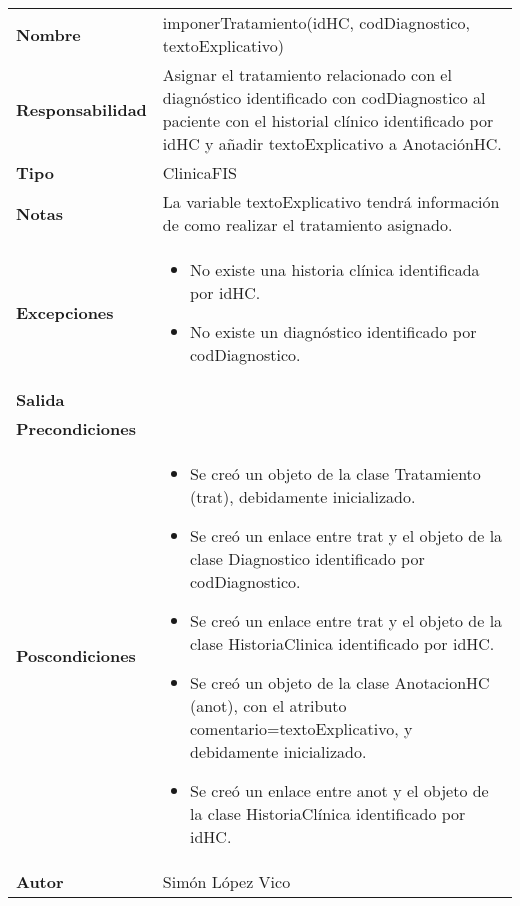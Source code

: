 \documentclass[11pt,a4paper]{article}
\newenvironment{itemizenomargins}
    {\begin{minipage}[t]{1\linewidth}\begin{itemize}}
    {\end{itemize}\end{minipage}}
\begin{document}
\begin{table}[H]
	\centering
	\label{my-label}
	\begin{tabularx}{\textwidth}{l|X}
		\textbf{Nombre}          & imponerTratamiento(idHC, codDiagnostico, textoExplicativo)\\
		\textbf{Responsabilidad} & Asignar el tratamiento relacionado con el diagnóstico identificado con codDiagnostico al paciente con el historial clínico identificado por idHC y añadir textoExplicativo a AnotaciónHC.  \\
		\textbf{Tipo}            & ClinicaFIS \\
		\textbf{Notas}           & La variable textoExplicativo tendrá información de como realizar el tratamiento asignado. \\
		\textbf{Excepciones}     & 
		\begin{itemizenomargins}
			\item No existe una historia clínica identificada por idHC.
			\item No existe un diagnóstico identificado por codDiagnostico.
		\end{itemizenomargins} \\
		\textbf{Salida}          &  \\
		\textbf{Precondiciones}  &  \\
		\textbf{Poscondiciones}  &
		\begin{itemizenomargins}
			\item Se creó un objeto de la clase Tratamiento (trat), debidamente inicializado.
			\item Se creó un enlace entre trat y el objeto de la clase Diagnostico identificado por codDiagnostico. 
			\item Se creó un enlace entre trat y el objeto de la clase HistoriaClinica identificado por idHC.
			\item Se creó un objeto de la clase AnotacionHC (anot), con el atributo comentario=textoExplicativo, y debidamente inicializado.
			\item Se creó un enlace entre anot y el objeto de la clase HistoriaClínica identificado por idHC.
		\end{itemizenomargins} \\
		\textbf{Autor}			 & Simón López Vico
	\end{tabularx}
\end{table}
\end{document}
